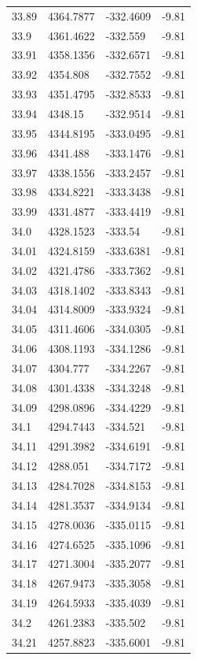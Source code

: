 \begin{table}[H]
\begin{tabular}{llll}
33.89 & 4364.7877 & -332.4609 & -9.81 \\
33.9 & 4361.4622 & -332.559 & -9.81 \\
33.91 & 4358.1356 & -332.6571 & -9.81 \\
33.92 & 4354.808 & -332.7552 & -9.81 \\
33.93 & 4351.4795 & -332.8533 & -9.81 \\
33.94 & 4348.15 & -332.9514 & -9.81 \\
33.95 & 4344.8195 & -333.0495 & -9.81 \\
33.96 & 4341.488 & -333.1476 & -9.81 \\
33.97 & 4338.1556 & -333.2457 & -9.81 \\
33.98 & 4334.8221 & -333.3438 & -9.81 \\
33.99 & 4331.4877 & -333.4419 & -9.81 \\
34.0 & 4328.1523 & -333.54 & -9.81 \\
34.01 & 4324.8159 & -333.6381 & -9.81 \\
34.02 & 4321.4786 & -333.7362 & -9.81 \\
34.03 & 4318.1402 & -333.8343 & -9.81 \\
34.04 & 4314.8009 & -333.9324 & -9.81 \\
34.05 & 4311.4606 & -334.0305 & -9.81 \\
34.06 & 4308.1193 & -334.1286 & -9.81 \\
34.07 & 4304.777 & -334.2267 & -9.81 \\
34.08 & 4301.4338 & -334.3248 & -9.81 \\
34.09 & 4298.0896 & -334.4229 & -9.81 \\
34.1 & 4294.7443 & -334.521 & -9.81 \\
34.11 & 4291.3982 & -334.6191 & -9.81 \\
34.12 & 4288.051 & -334.7172 & -9.81 \\
34.13 & 4284.7028 & -334.8153 & -9.81 \\
34.14 & 4281.3537 & -334.9134 & -9.81 \\
34.15 & 4278.0036 & -335.0115 & -9.81 \\
34.16 & 4274.6525 & -335.1096 & -9.81 \\
34.17 & 4271.3004 & -335.2077 & -9.81 \\
34.18 & 4267.9473 & -335.3058 & -9.81 \\
34.19 & 4264.5933 & -335.4039 & -9.81 \\
34.2 & 4261.2383 & -335.502 & -9.81 \\
34.21 & 4257.8823 & -335.6001 & -9.81 \\

\end{tabular}
\end{table}
